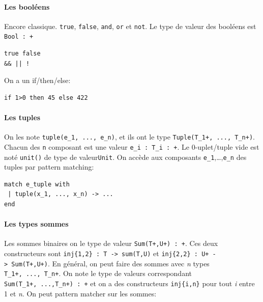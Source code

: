 \documentclass[12pt]{article}
\begin{document}
\hypertarget{les-booluxe9ens}{%
      \paragraph*{Les booléens}\label{les-booluxe9ens}}

Encore classique. \texttt{true}, \texttt{false}, \texttt{and},
\texttt{or} et \texttt{not}. Le type de valeur des booléens est
\texttt{Bool\ :\ +}

\begin{verbatim}
true false 
&& || ! 
\end{verbatim}

On a un if/then/else:

\begin{verbatim}
if 1>0 then 45 else 422 
\end{verbatim}

\hypertarget{les-tuples}{%
      \paragraph*{Les tuples}\label{les-tuples}}

On les note \texttt{tuple(e\_1,\ ...,\ e\_n)}, et ils ont le type
\texttt{Tuple(T\_1+,\ ...,\ T\_n+)}. Chacun des \texttt{n} composant est
une valeur \texttt{e\_i\ :\ T\_i\ :\ +}. Le 0-uplet/tuple vide est noté
\texttt{unit()} de type de valeur\texttt{Unit}. On accède aux composants
\texttt{e\_1},\ldots,\texttt{e\_n} des tuples par pattern matching:

\begin{verbatim}
match e_tuple with
 | tuple(x_1, ..., x_n) -> ... 
end
\end{verbatim}

\hypertarget{les-types-sommes}{%
      \paragraph*{Les types sommes}\label{les-types-sommes}}

Les sommes binaires on le type de valeur \texttt{Sum(T+,U+)\ :\ +}. Ces
deux constructeurs sont
\texttt{inj\{1,2\}\ :\ T\ -\textgreater{}\ sum(T,U)} et
\texttt{inj\{2,2\}\ :\ U+\ -\textgreater{}\ Sum(T+,U+)}. En général, on
peut faire des sommes avec \emph{n} types \texttt{T\_1+,\ ...,\ T\_n+}.
On note le type de valeurs correspondant
\texttt{Sum(T\_1+,\ ...,T\_n+)\ :\ +} et on a des constructeurs
\texttt{inj\{i,n\}} pour tout \emph{i} entre 1 et \emph{n}. On peut
pattern matcher sur les sommes:
\end{document}
